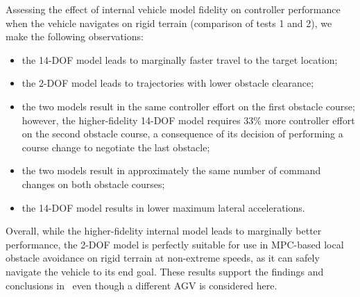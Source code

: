 \documentclass[12pt,twocolumn]{article}
\newcommand{\CHRONO}{{\sffamily{{Chrono}}}}
\begin{document}
Assessing the effect of internal vehicle model fidelity on controller performance when the vehicle navigates on rigid terrain (comparison of tests 1 and 2), we make the following observations:
\begin{itemize}
\item the 14-DOF model leads to marginally faster travel to the target location;
\item the 2-DOF model leads to trajectories with lower obstacle clearance;
\item the two models result in the same controller effort on the first obstacle course; however, the higher-fidelity 14-DOF model requires 33\% more controller effort on the second obstacle course, a consequence of its decision of performing a course change to negotiate the last obstacle;
\item the two models result in approximately the same number of command changes on both obstacle courses;
\item the 14-DOF model results in lower maximum lateral accelerations.
\end{itemize}
%
%
%
Overall, while the higher-fidelity internal model leads to marginally better performance, the 2-DOF model is perfectly suitable for use in MPC-based local obstacle avoidance on rigid terrain at non-extreme speeds, as it can safely navigate the vehicle to its end goal. These results support the findings and conclusions in~\cite{ModelFidelity2016} even though a different AGV is considered here.

\end{document}
